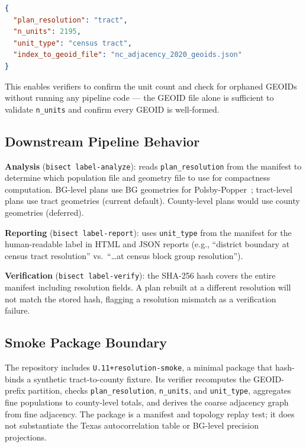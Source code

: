 \begin{lstlisting}[language=json]
{
  "plan_resolution": "tract",
  "n_units": 2195,
  "unit_type": "census tract",
  "index_to_geoid_file": "nc_adjacency_2020_geoids.json"
}
\end{lstlisting}

\noindent
This enables verifiers to confirm the unit count and check for orphaned GEOIDs
without running any pipeline code --- the GEOID file alone is sufficient to
validate \texttt{n\_units} and confirm every GEOID is well-formed.

\subsection{Downstream Pipeline Behavior}

\textbf{Analysis} (\texttt{bisect label-analyze}): reads
\texttt{plan\_resolution} from the manifest to determine which population
file and geometry file to use for compactness computation.
BG-level plans use BG geometries for Polsby-Popper~\citep{polsby1991third};
tract-level plans use tract geometries (current default).
County-level plans would use county geometries (deferred).

\textbf{Reporting} (\texttt{bisect label-report}): uses \texttt{unit\_type}
from the manifest for the human-readable label in HTML and JSON reports
(e.g., ``district boundary at census tract resolution'' vs.\ ``\ldots at
census block group resolution'').

\textbf{Verification} (\texttt{bisect label-verify}): the SHA-256 hash
covers the entire manifest including resolution fields.
A plan rebuilt at a different resolution will not match the stored hash,
flagging a resolution mismatch as a verification failure.

\subsection{Smoke Package Boundary}

The repository includes \texttt{U.11+resolution-smoke}, a minimal package that
hash-binds a synthetic tract-to-county fixture.  Its verifier recomputes the
GEOID-prefix partition, checks \texttt{plan\_resolution}, \texttt{n\_units},
and \texttt{unit\_type}, aggregates fine populations to county-level totals,
and derives the coarse adjacency graph from fine adjacency.  The package is a
manifest and topology replay test; it does not substantiate the Texas
autocorrelation table or BG-level precision projections.
